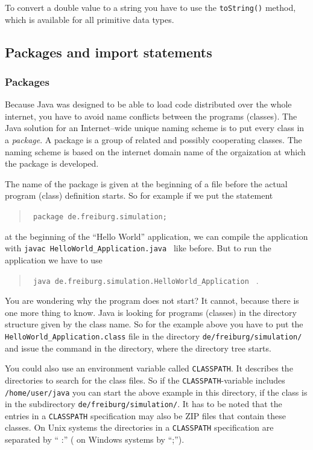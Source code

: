 To convert a double value to a string you have to use the \verb|toString()|
method, which is available for all primitive data types. 



\subsection{Packages and import statements}
\subsubsection{Packages}
Because Java was designed to be able to load code distributed
over the whole internet, you have to avoid name conflicts
between the programs (classes). The Java solution 
for an Internet--wide unique naming scheme is to put
every class in a \emph{package}. A package  is a group of related
and possibly cooperating classes. The naming scheme is based on the
internet domain name of the orgaization at which the package is developed.

The name of the package is given
at the beginning of a file before the actual program (class)
definition starts. So for example if we put the statement
\begin{quotation}
  \verb/ package de.freiburg.simulation; / 
\end{quotation}
at the beginning of the ``Hello World'' application, we can compile
the application with \verb/javac HelloWorld_Application.java / like before.
But to run the application we have to use
\begin{quotation}
  \verb/ java de.freiburg.simulation.HelloWorld_Application / . 
\end{quotation}
You are wondering why the program does not start? It cannot, because
there is one more thing to know. Java is looking for programs (classes)
in the directory structure given by the class name. So
for the example above you have to put the \verb/HelloWorld_Application.class/ file
in the directory \verb|de/freiburg/simulation/| and issue the command
in the directory, where the directory tree starts.

You could also use an environment variable called \verb|CLASSPATH|. It
describes the directories to search for the class files. So if the
\verb|CLASSPATH|-variable includes \verb|/home/user/java| you can
start the above example in this directory, if the class is in the 
subdirectory  \verb|de/freiburg/simulation/|. It has to be noted that
the entries in a \verb|CLASSPATH| specification may also be ZIP files
that contain these classes. On Unix systems the directories in a
\verb|CLASSPATH| specification are separated by `` :'' ( on Windows systems
by ``;'').


